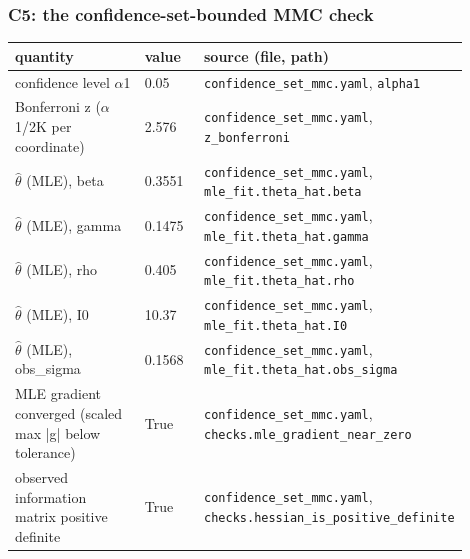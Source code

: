 \subsubsection*{C5: the confidence-set-bounded MMC check}
\begin{longtable}{p{0.35\linewidth} p{0.14\linewidth} p{0.41\linewidth}}
\toprule
quantity & value & source (file, path) \\
\midrule
\endhead
confidence level $\alpha$1 & 0.05 & \texttt{\footnotesize confidence\_\allowbreak{}set\_\allowbreak{}mmc.\allowbreak{}yaml}, \texttt{\footnotesize alpha1} \\
Bonferroni z ($\alpha$1/2K per coordinate) & 2.576 & \texttt{\footnotesize confidence\_\allowbreak{}set\_\allowbreak{}mmc.\allowbreak{}yaml}, \texttt{\footnotesize z\_\allowbreak{}bonferroni} \\
$\hat{\theta}$ (MLE), beta & 0.3551 & \texttt{\footnotesize confidence\_\allowbreak{}set\_\allowbreak{}mmc.\allowbreak{}yaml}, \texttt{\footnotesize mle\_\allowbreak{}fit.\allowbreak{}theta\_\allowbreak{}hat.\allowbreak{}beta} \\
$\hat{\theta}$ (MLE), gamma & 0.1475 & \texttt{\footnotesize confidence\_\allowbreak{}set\_\allowbreak{}mmc.\allowbreak{}yaml}, \texttt{\footnotesize mle\_\allowbreak{}fit.\allowbreak{}theta\_\allowbreak{}hat.\allowbreak{}gamma} \\
$\hat{\theta}$ (MLE), rho & 0.405 & \texttt{\footnotesize confidence\_\allowbreak{}set\_\allowbreak{}mmc.\allowbreak{}yaml}, \texttt{\footnotesize mle\_\allowbreak{}fit.\allowbreak{}theta\_\allowbreak{}hat.\allowbreak{}rho} \\
$\hat{\theta}$ (MLE), I0 & 10.37 & \texttt{\footnotesize confidence\_\allowbreak{}set\_\allowbreak{}mmc.\allowbreak{}yaml}, \texttt{\footnotesize mle\_\allowbreak{}fit.\allowbreak{}theta\_\allowbreak{}hat.\allowbreak{}I0} \\
$\hat{\theta}$ (MLE), obs\_sigma & 0.1568 & \texttt{\footnotesize confidence\_\allowbreak{}set\_\allowbreak{}mmc.\allowbreak{}yaml}, \texttt{\footnotesize mle\_\allowbreak{}fit.\allowbreak{}theta\_\allowbreak{}hat.\allowbreak{}obs\_\allowbreak{}sigma} \\
MLE gradient converged (scaled max |g| below tolerance) & True & \texttt{\footnotesize confidence\_\allowbreak{}set\_\allowbreak{}mmc.\allowbreak{}yaml}, \texttt{\footnotesize checks.\allowbreak{}mle\_\allowbreak{}gradient\_\allowbreak{}near\_\allowbreak{}zero} \\
observed information matrix positive definite & True & \texttt{\footnotesize confidence\_\allowbreak{}set\_\allowbreak{}mmc.\allowbreak{}yaml}, \texttt{\footnotesize checks.\allowbreak{}hessian\_\allowbreak{}is\_\allowbreak{}positive\_\allowbreak{}definite} \\

\end{longtable}
